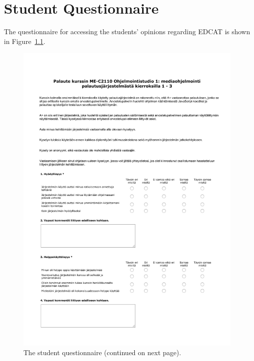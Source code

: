 \chapter{Student Questionnaire}
\label{appendix:studentquestionnaire}

The questionnaire for accessing the students' opinions regarding EDCAT is shown in Figure~\ref{fig:studentquestionnaire}.

\begin{figure}
\caption{The student questionnaire (continued on next page).}
\label{fig:studentquestionnaire}
\includegraphics[page=1, width=\textwidth, height=\textheight]{images/kysely-opiskelijat1.pdf}
\end{figure}

